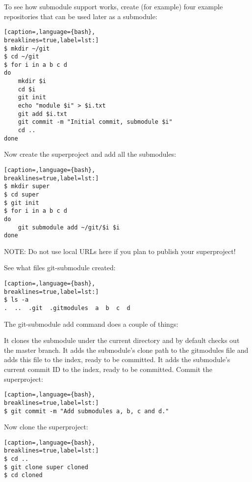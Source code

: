 To see how submodule support works, create (for example) four example
repositories that can be used later as a submodule:
\lstset{basicstyle=\scriptsize, numbers=none, captionpos=b, tabsize=4}
\begin{lstlisting}[caption=,language={bash},
breaklines=true,label=lst:]
$ mkdir ~/git
$ cd ~/git
$ for i in a b c d
do
    mkdir $i
    cd $i
    git init
    echo "module $i" > $i.txt
    git add $i.txt
    git commit -m "Initial commit, submodule $i"
    cd ..
done
\end{lstlisting}

Now create the superproject and add all the submodules:
\lstset{basicstyle=\scriptsize, numbers=none, captionpos=b, tabsize=4}
\begin{lstlisting}[caption=,language={bash},
breaklines=true,label=lst:]
$ mkdir super
$ cd super
$ git init
$ for i in a b c d
do
    git submodule add ~/git/$i $i
done
\end{lstlisting}

NOTE: Do not use local URLs here if you plan to publish your superproject!

See what files git-submodule created:
\lstset{basicstyle=\scriptsize, numbers=none, captionpos=b, tabsize=4}
\begin{lstlisting}[caption=,language={bash},
breaklines=true,label=lst:]
$ ls -a
.  ..  .git  .gitmodules  a  b  c  d
\end{lstlisting}

The git-submodule add command does a couple of things:

It clones the submodule under the current directory and by default checks out
the master branch.  It adds the submodule's clone path to the gitmodules file
and adds this file to the index, ready to be committed.  It adds the
submodule's current commit ID to the index, ready to be committed.  Commit the
superproject:
\lstset{basicstyle=\scriptsize, numbers=none, captionpos=b, tabsize=4}
\begin{lstlisting}[caption=,language={bash},
breaklines=true,label=lst:]
$ git commit -m "Add submodules a, b, c and d."
\end{lstlisting}

Now clone the superproject:
\lstset{basicstyle=\scriptsize, numbers=none, captionpos=b, tabsize=4}
\begin{lstlisting}[caption=,language={bash},
breaklines=true,label=lst:]
$ cd ..
$ git clone super cloned
$ cd cloned
\end{lstlisting}

